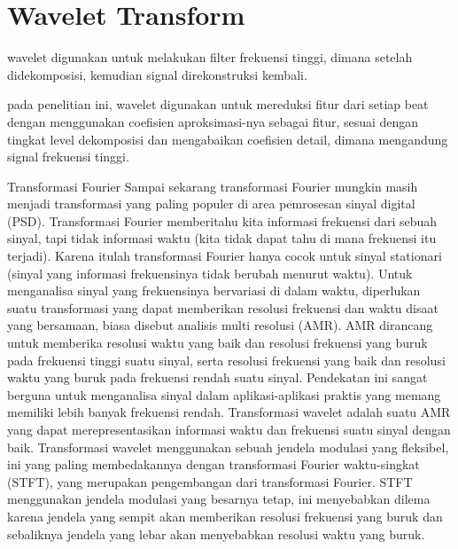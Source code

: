 \section{Wavelet Transform}
\label{sec:wt}


wavelet digunakan untuk melakukan filter frekuensi tinggi,
dimana setelah didekomposisi, kemudian signal direkonstruksi kembali.

pada penelitian ini, wavelet digunakan untuk mereduksi fitur dari setiap beat
dengan menggunakan coefisien aproksimasi-nya sebagai fitur, sesuai dengan
tingkat level dekomposisi dan mengabaikan coefisien detail, dimana mengandung
signal frekuensi tinggi.


Transformasi Fourier
Sampai sekarang transformasi Fourier mungkin masih menjadi transformasi yang
paling populer di area pemrosesan sinyal digital (PSD). Transformasi Fourier
memberitahu kita informasi frekuensi dari sebuah sinyal, tapi tidak informasi
waktu (kita tidak dapat tahu di mana frekuensi itu terjadi). Karena itulah
transformasi Fourier hanya cocok untuk sinyal stationari (sinyal yang informasi
frekuensinya tidak berubah menurut waktu). Untuk menganalisa sinyal yang
frekuensinya bervariasi di dalam waktu, diperlukan suatu transformasi yang dapat
memberikan resolusi frekuensi dan waktu disaat yang bersamaan, biasa disebut
analisis multi resolusi (AMR). AMR dirancang untuk memberika resolusi waktu yang
baik dan resolusi frekuensi yang buruk pada frekuensi tinggi suatu sinyal, serta
resolusi frekuensi yang baik dan resolusi waktu yang buruk pada frekuensi rendah
suatu sinyal. Pendekatan ini sangat berguna untuk menganalisa sinyal dalam
aplikasi-aplikasi praktis yang memang memiliki lebih banyak frekuensi rendah.
Transformasi wavelet adalah suatu AMR yang dapat merepresentasikan informasi
waktu dan frekuensi suatu sinyal dengan baik. Transformasi wavelet menggunakan
sebuah jendela modulasi yang fleksibel, ini yang paling membedakannya dengan
transformasi Fourier waktu-singkat (STFT), yang merupakan pengembangan dari
transformasi Fourier. STFT menggunakan jendela modulasi yang besarnya tetap, ini
menyebabkan dilema karena jendela yang sempit akan memberikan resolusi frekuensi
yang buruk dan sebaliknya jendela yang lebar akan menyebabkan resolusi waktu
yang buruk.

